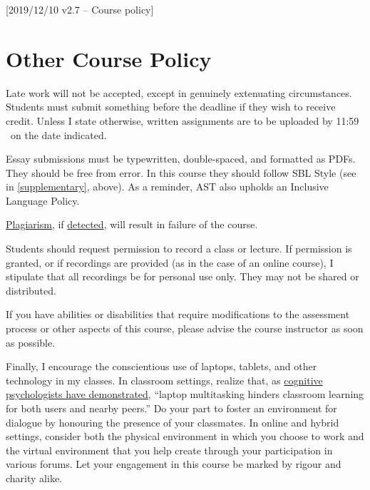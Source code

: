 [2019/12/10 v2.7 -- Course policy]

\section{Other Course Policy}
\label{policy}

Late work will not be accepted, except in genuinely extenuating
circumstances. Students must submit something before the deadline if
they wish to receive credit. Unless I state otherwise, written
assignments are to be uploaded by 11:59 \PM\ on the date indicated.

Essay submissions must be typewritten, double-spaced, and formatted as
PDFs. They should be free from error. In this course they should follow
SBL Style (see \cite{sbl2} in \autoref{supplementary}, above). As a
reminder, AST also upholds an Inclusive Language Policy.

\href{http://www.eerdmans.com/Pages/Item/59043/Commentary-Statement.aspx}{Plagiarism},
if \href{https://www.theguardian.com/world/2013/feb/09/german-education-minister-quits-phd-plagiarism}{detected},
will result in failure of the course.

Students should request permission to record a class or lecture. If
permission is granted, or if recordings are provided (as in the case of
an online course), I stipulate that all recordings be for personal use
only. They may not be shared or distributed.

If you have abilities or disabilities that require modifications to the
assessment process or other aspects of this course, please advise the
course instructor as soon as possible.

Finally, I encourage the conscientious use of laptops, tablets, and
other technology in my classes. In classroom settings, realize that, as
\href{http://dx.doi.org/10.1016/j.compedu.2012.10.003}{cognitive
psychologists have demonstrated}, ``laptop multitasking hinders
classroom learning for both users and nearby peers.'' Do your part to
foster an environment for dialogue by honouring the presence of your
classmates. In online and hybrid settings, consider both the physical
environment in which you choose to work and the virtual environment that
you help create through your participation in various forums. Let your
engagement in this course be marked by rigour and charity alike.
